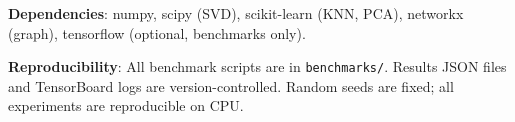 \documentclass[12pt,letterpaper]{article}
\begin{document}
\noindent\textbf{Dependencies}: numpy, scipy (SVD), scikit-learn (KNN, PCA),
networkx (graph), tensorflow (optional, benchmarks only).

\noindent\textbf{Reproducibility}: All benchmark scripts are in
\texttt{benchmarks/}.  Results JSON files and TensorBoard logs are
version-controlled.  Random seeds are fixed; all experiments are reproducible on
CPU\@.
\end{document}
